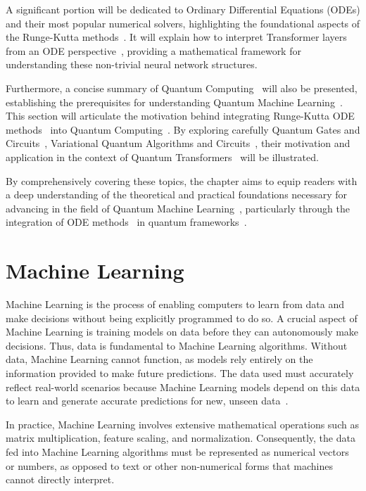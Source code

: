 \documentclass[12pt,a4paper]{report}
\begin{document}
A significant portion will be dedicated to Ordinary Differential Equations (ODEs) and their most popular numerical solvers, highlighting the foundational aspects of the Runge-Kutta methods~\cite{butcher1996history}. It will explain how to interpret Transformer layers from an ODE perspective~\cite{li2022ode}, providing a mathematical framework for understanding these non-trivial neural network structures.

Furthermore, a concise summary of Quantum Computing~\cite{nielsen2001quantum} will also be presented, establishing the prerequisites for understanding Quantum Machine Learning~\cite{dunjko2018machine}. This section will articulate the motivation behind integrating Runge-Kutta ODE methods~\cite{butcher1996history, fan2024Quantum} into Quantum Computing~\cite{nielsen2001quantum}. By exploring carefully Quantum Gates and Circuits~\cite{barenco1995elementary, benedetti2019parameterized}, Variational Quantum Algorithms and Circuits~\cite{cerezo2021variational, benedetti2019parameterized}, their motivation and application in the context of Quantum Transformers~\cite{Comajoan_Cara_2024} will be illustrated.

By comprehensively covering these topics, the chapter aims to equip readers with a deep understanding of the theoretical and practical foundations necessary for advancing in the field of Quantum Machine Learning~\cite{dunjko2018machine}, particularly through the integration of ODE methods~\cite{zhong2022neural} in quantum frameworks~\cite{Zhang_2023}.

\section{Machine Learning}\vspace{-12pt}
Machine Learning is the process of enabling computers to learn from data and make decisions without being explicitly programmed to do so. A crucial aspect of Machine Learning is training models on data before they can autonomously make decisions. Thus, data is fundamental to Machine Learning algorithms. Without data, Machine Learning cannot function, as models rely entirely on the information provided to make future predictions. The data used must accurately reflect real-world scenarios because Machine Learning models depend on this data to learn and generate accurate predictions for new, unseen data~\cite{machinelearning}.

In practice, Machine Learning involves extensive mathematical operations such as matrix multiplication, feature scaling, and normalization. Consequently, the data fed into Machine Learning algorithms must be represented as numerical vectors or numbers, as opposed to text or other non-numerical forms that machines cannot directly interpret.
\end{document}
